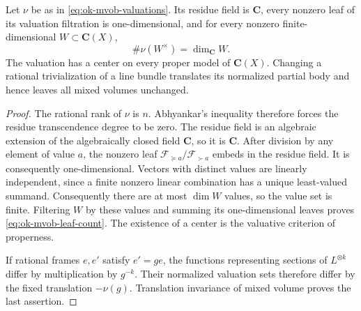 \begin{lemma}\label{lem:ok-mvob-valuative-leaves}
Let $\nu$ be as in \eqref{eq:ok-mvob-valuations}.  Its residue field is
$\mathbf C$, every nonzero leaf of its valuation filtration is
one-dimensional, and for every nonzero finite-dimensional
$W\subset\mathbf C(X)$,
\[
                         \#\nu(W^\times)=\dim_{\mathbf C}W.
\tag{55.27}\label{eq:ok-mvob-leaf-count}
\]
The valuation has a center on every proper model of $\mathbf C(X)$.
Changing a rational trivialization of a line bundle translates its
normalized partial body and hence leaves all mixed volumes unchanged.
\end{lemma}

\begin{proof}
The rational rank of $\nu$ is $n$.  Abhyankar's inequality therefore
forces the residue transcendence degree to be zero.  The residue field is
an algebraic extension of the algebraically closed field $\mathbf C$, so
it is $\mathbf C$.  After division by any element of value $a$, the
nonzero leaf
$\mathcal F_{\succeq a}/\mathcal F_{\succ a}$ embeds in the residue
field.  It is consequently one-dimensional.
Vectors with distinct values are linearly independent, since a finite
nonzero linear combination has a unique least-valued summand.
Consequently there are at most $\dim W$ values, so the value set is finite.
Filtering $W$ by these values and summing its one-dimensional leaves
proves \eqref{eq:ok-mvob-leaf-count}.  The existence of a center
is the valuative criterion of properness.

If rational frames $e,e'$ satisfy $e'=ge$, the functions representing
sections of $L^{\otimes k}$ differ by multiplication by $g^{-k}$.
Their normalized valuation sets therefore differ by the fixed translation
$-\nu(g)$.  Translation invariance of mixed volume proves the last
assertion.
\end{proof}

